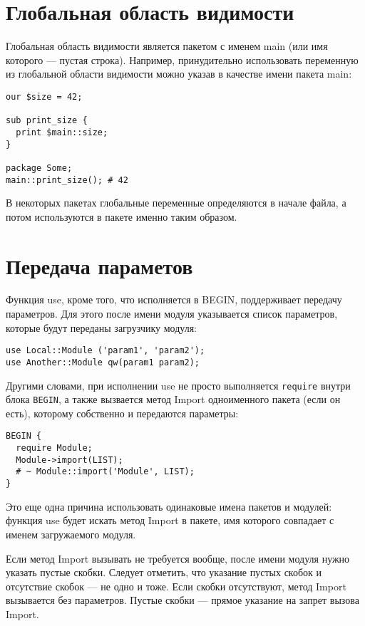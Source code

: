 \section{Глобальная область видимости} %
Глобальная область видимости является пакетом с именем main (или имя которого --- пустая строка). Например, принудительно использовать переменную из глобальной области видимости можно указав в качестве имени пакета main:
\begin{verbatim}
our $size = 42;

sub print_size {
  print $main::size;
}

package Some;
main::print_size(); # 42
\end{verbatim}
В некоторых пакетах глобальные переменные определяются в начале файла, а потом используются в пакете именно таким образом.

\section{Передача параметов} %
Функция use, кроме того, что исполняется в BEGIN, поддерживает передачу параметров. Для этого после имени модуля указывается список параметров, которые будут переданы загрузчику модуля:
\begin{verbatim}
use Local::Module ('param1', 'param2');
use Another::Module qw(param1 param2);
\end{verbatim}
Другими словами, при исполнении use не просто выполняется \verb|require| внутри блока \verb|BEGIN|, а также вызвается метод Import одноименного пакета (если он есть), которому собственно и передаются параметры:
\begin{verbatim}
BEGIN {
  require Module;
  Module->import(LIST);
  # ~ Module::import('Module', LIST);
}
\end{verbatim}
Это еще одна причина использовать одинаковые имена пакетов и модулей: функция use будет искать метод Import в пакете, имя которого совпадает с именем загружаемого модуля.

Если метод Import вызывать не требуется вообще, после имени модуля нужно указать пустые скобки. Следует отметить, что указание пустых скобок и отсутствие скобок --- не одно и тоже. Если скобки отсутствуют, метод Import вызывается без параметров. Пустые скобки --- прямое указание на запрет вызова Import.

